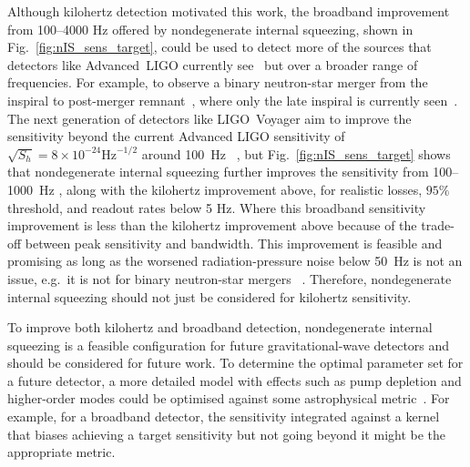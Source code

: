 Although kilohertz detection motivated this work, the broadband improvement from 100--4000 Hz offered by nondegenerate internal squeezing, shown in Fig.~\ref{fig:nIS_sens_target}, could be used to detect more of the sources that detectors like Advanced~LIGO currently see~\cite{} but over a broader range of frequencies. For example, to observe a binary neutron-star merger from the inspiral to post-merger remnant~\cite{}, where only the late inspiral is currently seen~\cite{}.  The next generation of detectors like LIGO~Voyager aim to improve the sensitivity beyond the current Advanced LIGO sensitivity of $\sqrt{S_h}=8\times10^{-24}\text{Hz}^{-1/2}$ around 100~Hz~\cite{Martynov2018} , but Fig.~\ref{fig:nIS_sens_target} shows that nondegenerate internal squeezing further improves the sensitivity from 100--1000~Hz , along with the kilohertz improvement above, for realistic losses, $95\%$ threshold, and readout rates below 5 Hz. Where this broadband sensitivity improvement is less than the kilohertz improvement above  because of the trade-off between peak sensitivity and bandwidth. This improvement is feasible and promising as long as the worsened radiation-pressure noise below 50~Hz is not an issue, e.g.\ it is not for binary neutron-star mergers~\cite{} . Therefore, nondegenerate internal squeezing should not just be considered for kilohertz sensitivity.


To improve both kilohertz and broadband detection, nondegenerate internal squeezing is a feasible configuration for future gravitational-wave detectors and should be considered for future work. To determine the optimal parameter set for a future detector, a more detailed model with effects such as pump depletion and higher-order modes  could be optimised against some astrophysical metric~\cite{}. For example, for a broadband detector, the sensitivity integrated against a kernel that biases achieving a target sensitivity but not going beyond it might be the appropriate metric. 


